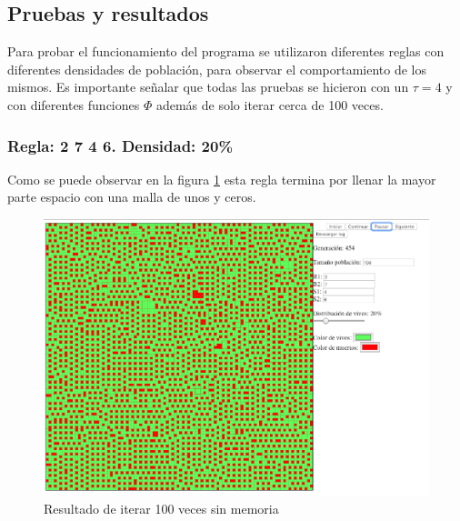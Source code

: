 \subsection{Pruebas y resultados}
	Para probar el funcionamiento del programa se utilizaron diferentes reglas con diferentes densidades de población, para observar el comportamiento de los mismos. Es importante señalar que todas las pruebas se hicieron con un $\tau=4$ y con diferentes funciones $\Phi$ además de solo iterar cerca de 100 veces.

	\subsubsection{Regla: 2 7 4 6. Densidad: 20\%}
	Como se puede observar en la figura \ref{fig:golm1} esta regla termina por llenar la mayor parte espacio con una malla de unos y ceros.
	\begin{figure}[H]
		\begin{center}
			\includegraphics[scale=.3]{GOLM/img/regla2746-0.png}
			\caption{Resultado de iterar 100 veces sin memoria}
			\label{fig:golm1}
		\end{center}
	\end{figure}

